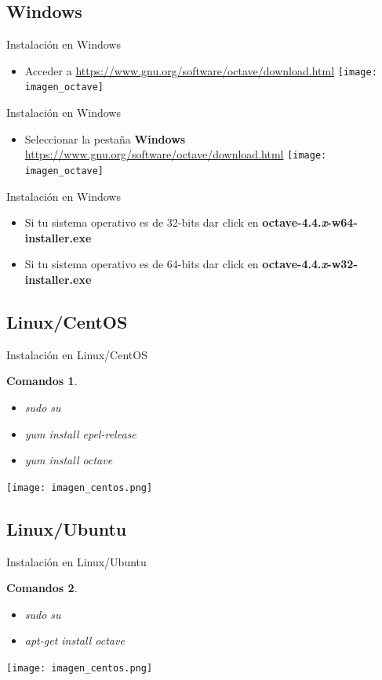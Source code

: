 \documentclass[12pt]{beamer}
\newtheorem{command}{Comandos}
\begin{document}
\subsection{Windows}
\begin{frame}{Instalación en Windows}
\begin{itemize}
	\item Acceder a \href{https://www.gnu.org/software/octave/download.html}{https://www.gnu.org/software/octave/download.html}
	\texttt{[image: imagen\_octave]}	
\end{itemize}
\end{frame}
\begin{frame}{Instalación en Windows}
\begin{itemize}
	\item Seleccionar la pestaña \textbf{Windows} \href{https://www.gnu.org/software/octave/download.html}{https://www.gnu.org/software/octave/download.html}
	\texttt{[image: imagen\_octave]}	
\end{itemize}
\end{frame}
\begin{frame}{Instalación en Windows}
\begin{itemize}
	\item Si tu sistema operativo es de 32-bits dar click en \textbf{octave-4.4.\textit{x}-w64-installer.exe}
	\item Si tu sistema operativo es de 64-bits dar click en \textbf{octave-4.4.\textit{x}-w32-installer.exe}
\end{itemize}
\end{frame}
\subsection{Linux/CentOS}
\begin{frame}{Instalación en Linux/CentOS}
\begin{command}
	\begin{itemize}
		\item sudo su
		\item yum install epel-release
		\item yum install octave
	\end{itemize}
\end{command}
\texttt{[image: imagen\_centos.png]}
\end{frame}
\subsection{Linux/Ubuntu}
\begin{frame}{Instalación en Linux/Ubuntu}
\begin{command}
	\begin{itemize}
		\item sudo su
		\item apt-get install octave
	\end{itemize}
\end{command}
\texttt{[image: imagen\_centos.png]}
\end{frame}
\end{document}
